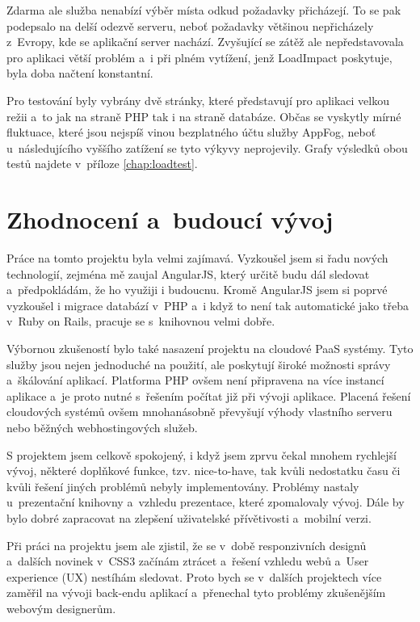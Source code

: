 \documentclass[11pt,twoside,a4paper]{book}
\newcommand*{\nomExpl}[2]{#2 (#1)\nomenclature{#1}{#2}} 	%
\begin{document}
Zdarma ale služba nenabízí výběr místa odkud požadavky přicházejí. To se pak podepsalo na delší odezvě serveru, neboť požadavky většinou nepřicházely z~Evropy, kde se aplikační server nachází. Zvyšující se zátěž ale nepředstavovala pro aplikaci větší problém a~i při plném vytížení, jenž LoadImpact poskytuje, byla doba načtení konstantní.

Pro testování byly vybrány dvě stránky, které představují pro aplikaci velkou režii a~to jak na straně PHP tak i na straně databáze. Občas se vyskytly mírné fluktuace, které jsou nejspíš vinou bezplatného účtu služby AppFog, neboť u~následujícího vyššího zatížení se tyto výkyvy neprojevily. Grafy výsledků obou testů najdete v~příloze \ref{chap:loadtest}.



\chapter{Zhodnocení a~budoucí vývoj}
Práce na tomto projektu byla velmi zajímavá. Vyzkoušel jsem si řadu nových technologií, zejména mě zaujal AngularJS, který určitě budu dál sledovat a~předpokládám, že ho využiji i budoucnu. Kromě AngularJS jsem si poprvé vyzkoušel i migrace databází v~PHP a~i když to není tak automatické jako třeba v~Ruby on Rails, pracuje se s~knihovnou velmi dobře.

Výbornou zkušeností bylo také nasazení projektu na cloudové PaaS systémy. Tyto služby jsou nejen jednoduché na použití, ale poskytují široké možnosti správy a~škálování aplikací. Platforma PHP ovšem není připravena na více instancí aplikace a~je proto nutné s~řešením počítat již při vývoji aplikace. Placená řešení cloudových systémů ovšem mnohanásobně převyšují výhody vlastního serveru nebo běžných webhostingových služeb.

S projektem jsem celkově spokojený, i když jsem zprvu čekal mnohem rychlejší vývoj, některé doplňkové funkce, tzv. nice-to-have, tak kvůli nedostatku času či kvůli řešení jiných problémů nebyly imple\-mentovány. Problémy nastaly u~prezentační knihovny a~vzhledu prezentace, které zpomalovaly vývoj. Dále by bylo dobré zapracovat na zlepšení uživatelské přívětivosti a~mobilní verzi.

Při práci na projektu jsem ale zjistil, že se v~době responzivních designů a~dalších novinek v~CSS3 začínám ztrácet a~řešení vzhledu webů a~\nomExpl{UX}{User experience} nestíhám sledovat. Proto bych se v~dalších projektech více zaměřil na vývoji back-endu aplikací a~přenechal tyto problémy zkušenějším webovým designerům.
\end{document}
